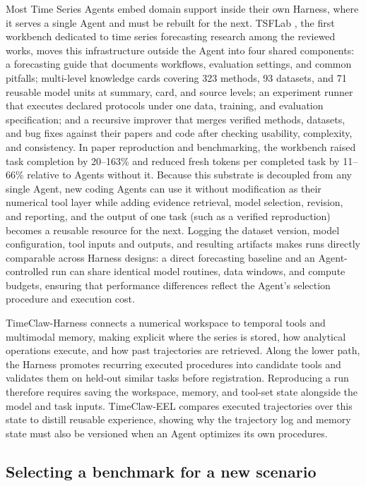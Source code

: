 \documentclass[preprints,article,submit,moreauthors]{Definitions/mdpi}
\begin{document}
Most Time Series Agents embed domain support inside their own Harness, where it serves a single Agent and must be rebuilt for the next. TSFLab \citep{tsflab2026}, the first workbench dedicated to time series forecasting research among the reviewed works, moves this infrastructure outside the Agent into four shared components: a forecasting guide that documents workflows, evaluation settings, and common pitfalls; multi-level knowledge cards covering 323 methods, 93 datasets, and 71 reusable model units at summary, card, and source levels; an experiment runner that executes declared protocols under one data, training, and evaluation specification; and a recursive improver that merges verified methods, datasets, and bug fixes against their papers and code after checking usability, complexity, and consistency. In paper reproduction and benchmarking, the workbench raised task completion by 20--163\% and reduced fresh tokens per completed task by 11--66\% relative to Agents without it. Because this substrate is decoupled from any single Agent, new coding Agents can use it without modification as their numerical tool layer while adding evidence retrieval, model selection, revision, and reporting, and the output of one task (such as a verified reproduction) becomes a reusable resource for the next. Logging the dataset version, model configuration, tool inputs and outputs, and resulting artifacts makes runs directly comparable across Harness designs: a direct forecasting baseline and an Agent-controlled run can share identical model routines, data windows, and compute budgets, ensuring that performance differences reflect the Agent's selection procedure and execution cost.

TimeClaw-Harness \citep{timeclaw2026harness} connects a numerical workspace to temporal tools and multimodal memory, making explicit where the series is stored, how analytical operations execute, and how past trajectories are retrieved. Along the lower path, the Harness promotes recurring executed procedures into candidate tools and validates them on held-out similar tasks before registration. Reproducing a run therefore requires saving the workspace, memory, and tool-set state alongside the model and task inputs. TimeClaw-EEL \citep{timeclaw2026explore} compares executed trajectories over this state to distill reusable experience, showing why the trajectory log and memory state must also be versioned when an Agent optimizes its own procedures.


\subsection{Selecting a benchmark for a new scenario}
\end{document}
